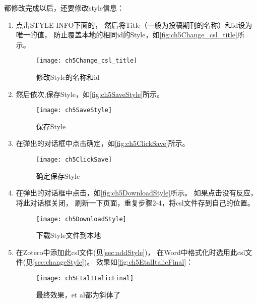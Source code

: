 \documentclass[cn,11pt,chinese]{elegantbook}
\begin{document}
				都修改完成以后，还要修改style信息：
				\begin{enumerate} \label{it:StyleInfo}
				\item 点击STYLE INFO下面的，
				然后将Title（一般为投稿期刊的名称）和id设为唯一的值，
				防止覆盖本地的相同id的Style，如\autoref{fig:ch5Change_csl_title}所示。
				\begin{figure}[htbp]
					\centering
					\texttt{[image: ch5Change\_csl\_title]}
					\caption{修改Style的名称和id}
					\label{fig:ch5Change_csl_title}
				\end{figure}
			\item 然后依次,保存Style，如\autoref{fig:ch5SaveStyle}所示。
				\begin{figure}[htbp]
					\centering
					\texttt{[image: ch5SaveStyle]}
					\caption{保存Style}
					\label{fig:ch5SaveStyle}
				\end{figure}
			\item 在弹出的对话框中点击确定，如\autoref{fig:ch5ClickSave}所示。
				\begin{figure}[htbp]
					\centering
					\texttt{[image: ch5ClickSave]}
					\caption{确定保存Style}
					\label{fig:ch5ClickSave}
				\end{figure}
			\item 在弹出的对话框中点击，如\autoref{fig:ch5DownloadStyle}所示。
			如果点击没有反应，将此对话框关闭，
			刷新一下页面，重复步骤2-4，将csl文件存到自己的位置。
				\begin{figure}[htbp]
					\centering
					\texttt{[image: ch5DownloadStyle]}
					\caption{下载Style文件到本地}
					\label{fig:ch5DownloadStyle}
				\end{figure}
			\item 在Zotero中添加此csl文件(见\cref{sec:addStyle})，
			在Word中格式化时选用此csl文件(见\cref{sec:changeStyle})。
			效果如\autoref{fig:ch5EtalItalicFinal}：
				\begin{figure}[htbp]
					\centering
					\texttt{[image: ch5EtalItalicFinal]}
					\caption{最终效果，et al都为斜体了}
					\label{fig:ch5EtalItalicFinal}
				\end{figure}
			\end{enumerate}	
	
\end{document}
